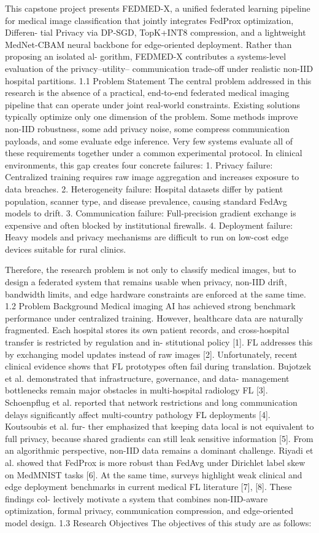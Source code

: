 This capstone project presents FEDMED-X, a unified federated learning pipeline for medical image classification that jointly integrates FedProx optimization, Differen- tial Privacy via DP-SGD, TopK+INT8 compression, and a lightweight MedNet-CBAM neural backbone for edge-oriented deployment. Rather than proposing an isolated al- gorithm, FEDMED-X contributes a systems-level evaluation of the privacy–utility– communication trade-off under realistic non-IID hospital partitions.
1.1
Problem Statement
The central problem addressed in this research is the absence of a practical, end-to-end federated medical imaging pipeline that can operate under joint real-world constraints.
Existing solutions typically optimize only one dimension of the problem. Some methods improve non-IID robustness, some add privacy noise, some compress communication payloads, and some evaluate edge inference. Very few systems evaluate all of these requirements together under a common experimental protocol.
In clinical environments, this gap creates four concrete failures:
1. Privacy failure: Centralized training requires raw image aggregation and increases exposure to data breaches.
2. Heterogeneity failure: Hospital datasets differ by patient population, scanner type, and disease prevalence, causing standard FedAvg models to drift.
3. Communication failure: Full-precision gradient exchange is expensive and often blocked by institutional firewalls.
4. Deployment failure: Heavy models and privacy mechanisms are difficult to run on low-cost edge devices suitable for rural clinics.

Therefore, the research problem is not only to classify medical images, but to design a federated system that remains usable when privacy, non-IID drift, bandwidth limits, and edge hardware constraints are enforced at the same time.
1.2
Problem Background
Medical imaging AI has achieved strong benchmark performance under centralized training.
However, healthcare data are naturally fragmented.
Each hospital stores its own patient records, and cross-hospital transfer is restricted by regulation and in- stitutional policy [1]. FL addresses this by exchanging model updates instead of raw images [2].
Unfortunately, recent clinical evidence shows that FL prototypes often fail during translation. Bujotzek et al. demonstrated that infrastructure, governance, and data- management bottlenecks remain major obstacles in multi-hospital radiology FL [3].
Schoenpflug et al. reported that network restrictions and long communication delays significantly affect multi-country pathology FL deployments [4]. Koutsoubis et al. fur- ther emphasized that keeping data local is not equivalent to full privacy, because shared gradients can still leak sensitive information [5].
From an algorithmic perspective, non-IID data remains a dominant challenge. Riyadi et al. showed that FedProx is more robust than FedAvg under Dirichlet label skew on
MedMNIST tasks [6].
At the same time, surveys highlight weak clinical and edge deployment benchmarks in current medical FL literature [7], [8]. These findings col- lectively motivate a system that combines non-IID-aware optimization, formal privacy, communication compression, and edge-oriented model design.
1.3
Research Objectives
The objectives of this study are as follows:


